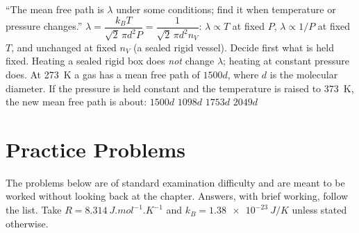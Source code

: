 {``The mean free path is $\lambda$ under some conditions; find it when temperature or pressure changes.''}
{$\lambda=\dfrac{k_BT}{\sqrt2\,\pi d^2 P}=\dfrac{1}{\sqrt2\,\pi d^2n_V}$: $\lambda\propto T$ at fixed $P$,
$\lambda\propto1/P$ at fixed $T$, and unchanged at fixed $n_V$ (a sealed rigid vessel).}
{Decide first what is held fixed. Heating a sealed rigid box does \emph{not} change $\lambda$; heating at
constant pressure does.}
{At \SI{273}{K} a gas has a mean free path of $1500d$, where $d$ is the molecular diameter. If the pressure
is held constant and the temperature is raised to \SI{373}{K}, the new mean free path is about:}
{$1500d$}
{$1098d$}
{$1753d$}
{$2049d$}

\section{Practice Problems}\label{sec:ktpractice}

The problems below are of standard examination difficulty and are meant to be worked without looking
back at the chapter. Answers, with brief working, follow the list. Take
$R = \SI{8.314}{J.mol^{-1}.K^{-1}}$ and $k_B=\SI{1.38e-23}{J/K}$ unless stated otherwise.

